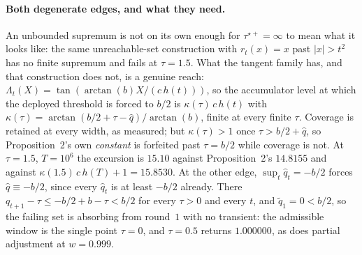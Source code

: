 \paragraph{Both degenerate edges, and what they need.} An unbounded supremum is not on its own
enough for $\tau^{\star+} = \infty$ to mean what it looks like: the same unreachable-set
construction with $r_t(x) = x$ past $|x| > t^2$ has no finite supremum and fails at $\tau = 1.5$.
What the tangent family has, and that construction does not, is a genuine reach:
$\Lambda_t(X) = \tan(\arctan(b)X/(c\,h(t)))$, so the accumulator level at which the deployed
threshold is forced to $b/2$ is $\kappa(\tau)\,c\,h(t)$ with $\kappa(\tau) = \arctan(b/2+\tau -
\hat{q})/\arctan(b)$, finite at every finite $\tau$. Coverage is retained at every width, as
measured; but $\kappa(\tau) > 1$ once $\tau > b/2 + \hat{q}$, so Proposition~2's own
\emph{constant} is forfeited past $\tau = b/2$ while coverage is not. At $\tau = 1.5$, $T = 10^6$
the excursion is $15.10$ against Proposition~2's $14.8155$ and against $\kappa(1.5)\,c\,h(T)+1 =
15.8530$. At the other edge, $\sup_t \hat{q}_t = -b/2$ forces $\hat{q} \equiv -b/2$, since every
$\hat{q}_t$ is at least $-b/2$ already. There $q_{t+1}-\tau \le -b/2+b-\tau < b/2$ for every
$\tau > 0$ and every $t$, and $\tilde{q}_1 = 0 < b/2$, so the failing set is absorbing from
round~$1$ with no transient: the admissible window is the single point $\tau = 0$, and $\tau = 0.5$
returns $1.000000$, as does partial adjustment at $w = 0.999$.


